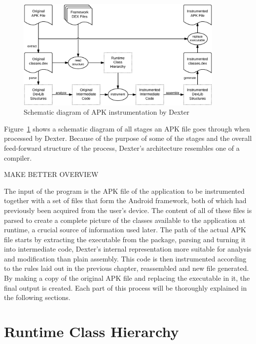 \documentclass[12pt,twoside,notitlepage]{report}
\begin{document}
\begin{figure}
	\centerline{	
		\includegraphics[width=0.9\textwidth]{figs/fig_implementation_overview.png}
	}
	\caption{Schematic diagram of APK instrumentation by Dexter}
	\label{fig:Implementation_Overview}
\end{figure}

Figure~\ref{fig:Implementation_Overview} shows a schematic diagram of all stages an APK file goes through when processed by Dexter. Because of the purpose of some of the stages and the overall feed-forward structure of the process, Dexter's architecture resembles one of a compiler.

MAKE BETTER OVERVIEW

The input of the program is the APK file of the application to be instrumented together with a set of files that form the Android framework, both of which had previously been acquired from the user's device. The content of all of these files is parsed to create a complete picture of the classes available to the application at runtime, a crucial source of information used later. The path of the actual APK file starts by extracting the executable from the package, parsing and turning it into intermediate code, Dexter's internal representation more suitable for analysis and modification than plain assembly. This code is then instrumented according to the rules laid out in the previous chapter, reassembled and new file generated. By making a copy of the original APK file and replacing the executable in it, the final output is created. Each part of this process will be thoroughly explained in the following sections.

\section{Runtime Class Hierarchy}
\end{document}
